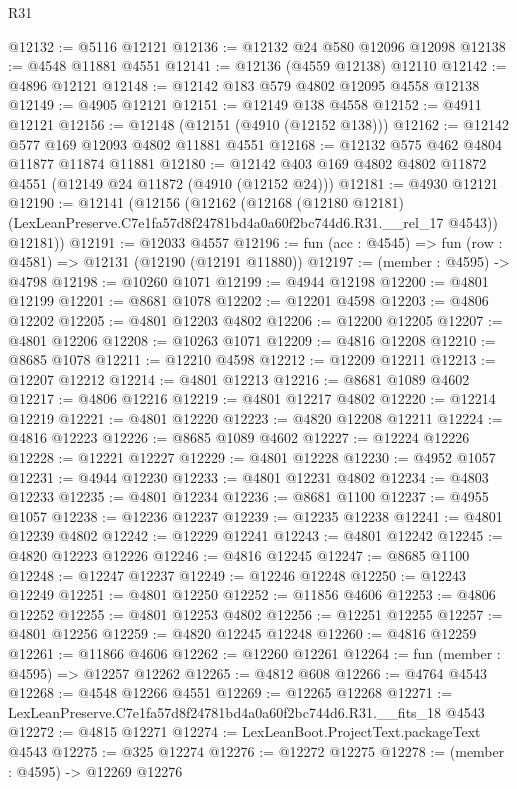 \begin{lexlean}{R31}
\begin{coremodule}
@12132 := @5116 @12121
@12136 := @12132 @24 @580 @12096 @12098
@12138 := @4548 @11881 @4551
@12141 := @12136 (@4559 @12138) @12110
@12142 := @4896 @12121
@12148 := @12142 @183 @579 @4802 @12095 @4558 @12138
@12149 := @4905 @12121
@12151 := @12149 @138 @4558
@12152 := @4911 @12121
@12156 := @12148 (@12151 (@4910 (@12152 @138)))
@12162 := @12142 @577 @169 @12093 @4802 @11881 @4551
@12168 := @12132 @575 @462 @4804 @11877 @11874 @11881
@12180 := @12142 @403 @169 @4802 @4802 @11872 @4551 (@12149 @24 @11872 (@4910 (@12152 @24)))
@12181 := @4930 @12121
@12190 := @12141
    (@12156
      (@12162
        (@12168
          (@12180 @12181)
          (LexLeanPreserve.C7e1fa57d8f24781bd4a0a60f2bc744d6.R31.__rel_17 @4543))
        @12181))
@12191 := @12033 @4557
@12196 := fun (acc : @4545) => fun (row : @4581) => @12131 (@12190 (@12191 @11880))
@12197 := (member : @4595) -> @4798
@12198 := @10260 @1071
@12199 := @4944 @12198
@12200 := @4801 @12199
@12201 := @8681 @1078
@12202 := @12201 @4598
@12203 := @4806 @12202
@12205 := @4801 @12203 @4802
@12206 := @12200 @12205
@12207 := @4801 @12206
@12208 := @10263 @1071
@12209 := @4816 @12208
@12210 := @8685 @1078
@12211 := @12210 @4598
@12212 := @12209 @12211
@12213 := @12207 @12212
@12214 := @4801 @12213
@12216 := @8681 @1089 @4602
@12217 := @4806 @12216
@12219 := @4801 @12217 @4802
@12220 := @12214 @12219
@12221 := @4801 @12220
@12223 := @4820 @12208 @12211
@12224 := @4816 @12223
@12226 := @8685 @1089 @4602
@12227 := @12224 @12226
@12228 := @12221 @12227
@12229 := @4801 @12228
@12230 := @4952 @1057
@12231 := @4944 @12230
@12233 := @4801 @12231 @4802
@12234 := @4803 @12233
@12235 := @4801 @12234
@12236 := @8681 @1100
@12237 := @4955 @1057
@12238 := @12236 @12237
@12239 := @12235 @12238
@12241 := @4801 @12239 @4802
@12242 := @12229 @12241
@12243 := @4801 @12242
@12245 := @4820 @12223 @12226
@12246 := @4816 @12245
@12247 := @8685 @1100
@12248 := @12247 @12237
@12249 := @12246 @12248
@12250 := @12243 @12249
@12251 := @4801 @12250
@12252 := @11856 @4606
@12253 := @4806 @12252
@12255 := @4801 @12253 @4802
@12256 := @12251 @12255
@12257 := @4801 @12256
@12259 := @4820 @12245 @12248
@12260 := @4816 @12259
@12261 := @11866 @4606
@12262 := @12260 @12261
@12264 := fun (member : @4595) => @12257 @12262
@12265 := @4812 @608
@12266 := @4764 @4543
@12268 := @4548 @12266 @4551
@12269 := @12265 @12268
@12271 := LexLeanPreserve.C7e1fa57d8f24781bd4a0a60f2bc744d6.R31.__fits_18 @4543
@12272 := @4815 @12271
@12274 := LexLeanBoot.ProjectText.packageText @4543
@12275 := @325 @12274
@12276 := @12272 @12275
@12278 := (member : @4595) -> @12269 @12276

\end{coremodule}
\end{lexlean}

